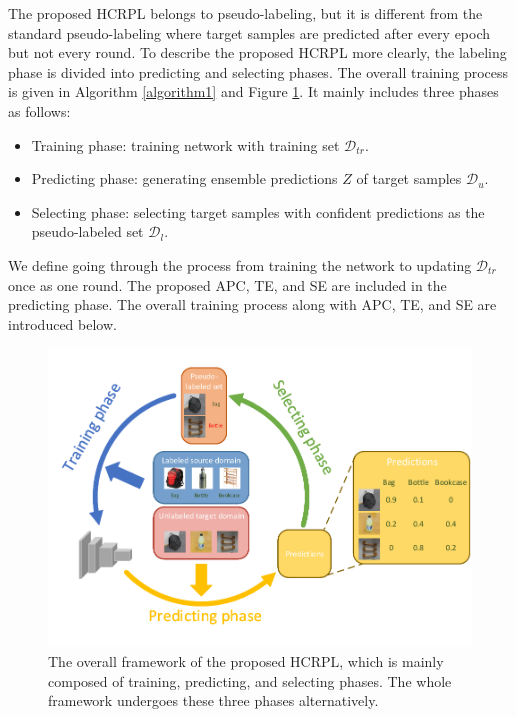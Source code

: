 \documentclass[a4paper,fleqn]{cas-dc}
\begin{document}
	The proposed HCRPL belongs to pseudo-labeling, but it is different from the standard pseudo-labeling where target samples are predicted after every epoch but not every round. To describe the proposed HCRPL more clearly, the labeling phase is divided into predicting and selecting phases. The overall training process is given in Algorithm \ref{algorithm1} and Figure \ref{fig2}. It mainly includes three phases as follows:
	\begin{itemize}
		\item [1)]
		Training phase: training network with training set $\mathcal{D}_{tr}$.
		\item [2)]
		Predicting phase: generating ensemble predictions $Z$ of target samples $\mathcal{D}_{u}$.
		\item [3)]
		Selecting phase: selecting target samples with confident predictions as the pseudo-labeled set $\mathcal{D}_{l}$.
	\end{itemize}
	
	We define going through the process from training the network to updating $\mathcal{D}_{tr}$ once as one round. The proposed APC, TE, and SE are included in the predicting phase. The overall training process along with APC, TE, and SE are introduced below.
	
	
	\begin{figure}[!t]
		\centering
		\includegraphics[width=\columnwidth]{figs/framework.pdf}
		\caption{The overall framework of the proposed HCRPL, which is mainly composed of training, predicting, and selecting phases. The whole framework undergoes these three phases alternatively. 
		}\label{fig2}
	\end{figure}
	
\end{document}
